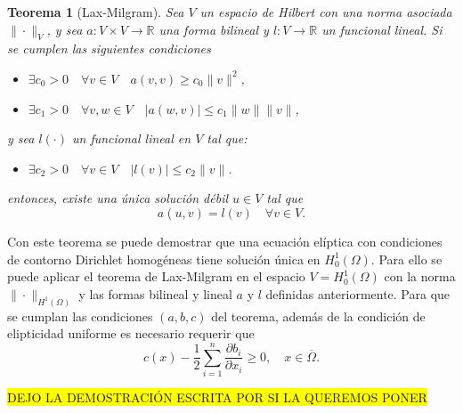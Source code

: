 \documentclass[a4paper,11pt,spanish, twoside, leqno]{tfg-uam}
\newtheorem{teor}{Teorema}[chapter]
\theoremstyle{definition}
\begin{document}
\begin{teor}[Lax-Milgram]
    Sea $V$ un espacio de Hilbert con una norma asociada $\|\cdot\|_V$, y sea $a:V\times V\rightarrow\mathbb{R}$ una forma bilineal y $l:V\rightarrow\mathbb{R}$ un funcional lineal. Si se cumplen las siguientes condiciones
    \begin{itemize}
        \item[(a)] $\exists c_0 > 0 \quad \forall v \in V \quad a(v,v) \geq c_0\|v\|^2$,
        \item[(b)] $\exists c_1 > 0 \quad \forall v, w \in V \quad |a(w,v)| \leq c_1\|w\|\|v\|$,
    \end{itemize}
    y sea $l(\cdot)$ un funcional lineal en $V$ tal que:
    \begin{itemize}
        \item[(c)] $\exists c_2 > 0 \quad \forall v \in V \quad |l(v)| \leq c_2\|v\|$.
    \end{itemize}
    entonces, existe una única solución débil $u\in V$ tal que
    \begin{equation*}
        a(u,v) = l(v) \quad \forall v\in V.
    \end{equation*}
\end{teor}
Con este teorema se puede demostrar que una ecuación elíptica con condiciones de contorno Dirichlet homogéneas tiene solución única en $H^1_0(\Omega)$. Para ello se puede aplicar el teorema de Lax-Milgram en el espacio $V=H^1_0(\Omega)$ con la norma $\|\cdot\|_{H^1(\Omega)}$ y las formas bilineal y lineal $a$ y $l$ definidas anteriormente. Para que se cumplan las condiciones $(a,b,c)$ del teorema, además de la condición de elipticidad uniforme es necesario requerir que
\begin{equation}\label{eq:condiciones_LaxMilgram_extra}
    c(x) - \frac{1}{2} \sum_{i=1}^n \frac{\partial b_i}{\partial x_i} \geq 0, \quad x \in \overline{\Omega}.
\end{equation}

\colorbox{yellow}{DEJO LA DEMOSTRACIÓN ESCRITA POR SI LA QUEREMOS PONER}
\end{document}

